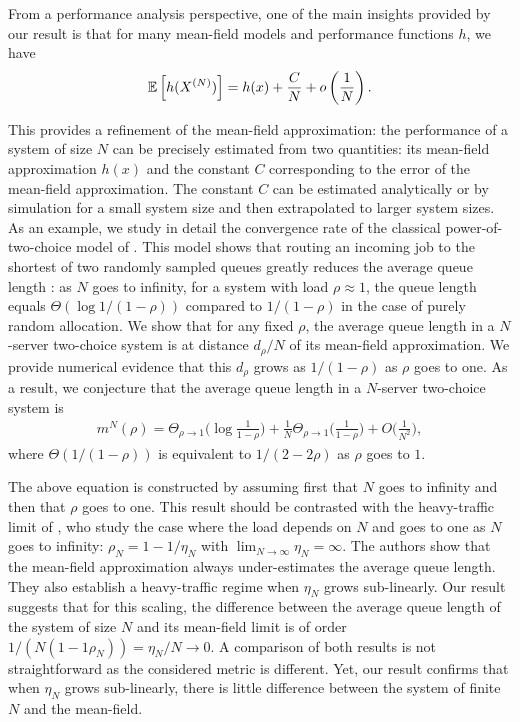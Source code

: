 \documentclass[sigconf]{acmart}
\newcommand\XN{X^{(N)}}
\newcommand\esp[1]{{\mathchoice{\besp{#1}}{\sesp{#1}}{\sesp{#1}}{\sesp{#1}}}}
\newcommand\besp[1]{\mathbb{E}\left[#1\right]}
\newcommand\sesp[1]{\mathbb{E}[#1]}
\newcommand\p[1]{\left(#1\right)}
\begin{document}
From a performance analysis perspective, one of the main insights
provided by our result is that for many mean-field models and
performance functions $h$, we have
\begin{align}
  \label{eq:C/N}
  \esp{h(\XN)} = h(x)+\frac{C}{N} + o\p{\frac1N}.
\end{align}

This provides a refinement of the mean-field approximation: the
performance of a system of size $N$ can be precisely estimated from
two quantities: its mean-field approximation $h(x)$ and the constant
$C$ corresponding to the error of the mean-field approximation. The
constant $C$ can be estimated analytically or by simulation for a
small system size and then extrapolated to larger system sizes.  As an
example, we study in detail the convergence rate of the classical
power-of-two-choice model of
\cite{mitzenmacher1996power,vvedenskaya1996queueing}. This model shows
that routing an incoming job to the shortest of two randomly sampled
queues greatly reduces the average queue length : as $N$ goes to
infinity, for a system with load $\rho\approx1$, the queue length
equals $\Theta(\log 1/(1-\rho))$ compared to $1/(1-\rho)$ in the case
of purely random allocation. We show that for any fixed $\rho$, the
average queue length in a $N$-server two-choice system is at distance
$d_\rho/N$ of its mean-field approximation. We provide numerical
evidence that this $d_\rho$ grows as $1/(1-\rho)$ as $\rho$ goes to
one. As a result, we conjecture that the average queue length in a
$N$-server two-choice system is 
\begin{align*}
  m^N(\rho) = \Theta_{\rho\to1}\Big(\log\frac1{1-\rho}\Big)
  + \frac{1}{N}\Theta_{\rho\to1}\Big(\frac{1}{1-\rho}\Big) +
  O\Big(\frac1{N^2}\Big),
\end{align*}
where $\Theta(1/(1-\rho))$ is equivalent to $1/(2-2\rho)$ as $\rho$
goes to $1$.

The above equation is constructed by assuming first that $N$ goes to
infinity and then that $\rho$ goes to one. This result should be
contrasted with the heavy-traffic limit of
\cite{eschenfeldt2016supermarket}, who study the case where the load
depends on $N$ and goes to one as $N$ goes to infinity:
$\rho_N=1-1/\eta_N$ with $\lim_{N\to\infty}\eta_N=\infty$. The authors
show that the mean-field approximation always under-estimates the
average queue length.  They also establish a heavy-traffic regime when
$\eta_N$ grows sub-linearly.  Our result suggests that for this
scaling, the difference between the average queue length of the system
of size $N$ and its mean-field limit is of order
$1/(N(1-1\rho_N))=\eta_N/N\to0$. A comparison of both results is not
straightforward as the considered metric is different. Yet, our result
confirms that when $\eta_N$ grows sub-linearly, there is little
difference between the system of finite $N$ and the mean-field.
\end{document}
